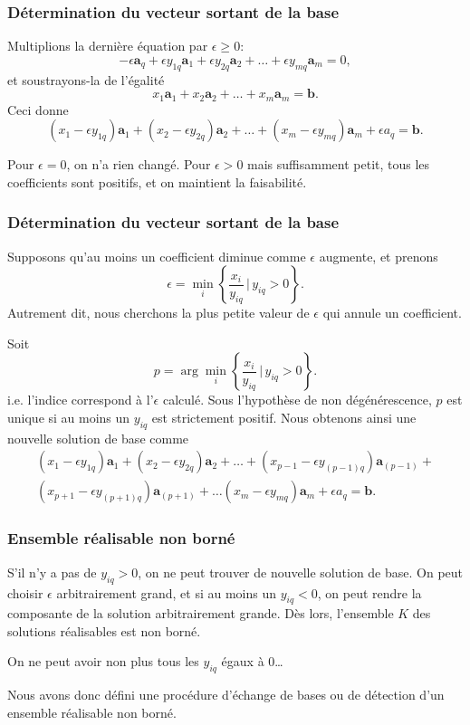 \documentclass[t,usepdftitle=false]{beamer}
\def\ba{\boldsymbol{a}}
\def\bb{\boldsymbol{b}}
\begin{document}
\begin{frame}
\frametitle{Détermination du vecteur sortant de la base}

Multiplions la dernière équation par $\epsilon \geq 0$:
\[
-\epsilon\ba_q + \epsilon y_{1q} \ba_1 + \epsilon y_{2q}\ba_2 + \ldots + \epsilon y_{mq} \ba_m = 0,
\]
et soustrayons-la de l'égalité
\[
x_1 \ba_1 + x_2 \ba_2 + \ldots + x_m \ba_m = \bb.
\]
Ceci donne
\[
(x_1 - \epsilon y_{1q}) \ba_1 + (x_2 - \epsilon y_{2q}) \ba_2 + \ldots + (x_m - \epsilon y_{mq}) \ba_m + \epsilon a_q = \bb.
\]

\mbox{}

Pour $\epsilon = 0$, on n'a rien changé. Pour $\epsilon > 0$ mais suffisamment petit, tous les coefficients sont positifs, et on maintient la faisabilité.

\end{frame}

\begin{frame}
\frametitle{Détermination du vecteur sortant de la base}

Supposons qu'au moins un coefficient diminue comme $\epsilon$ augmente, et prenons
\[
\epsilon = \min_i \left\lbrace \frac{x_i}{y_{iq}} \,\bigg|\, y_{iq} > 0 \right\rbrace.
\]
Autrement dit, nous cherchons la plus petite valeur de $\epsilon$ qui annule un coefficient.

\mbox{}

Soit
\[
p = \arg\min_i \left\lbrace \frac{x_i}{y_{iq}} \,\bigg|\, y_{iq} > 0 \right\rbrace.
\]
i.e. l'indice correspond à l'$\epsilon$ calculé.  Sous l'hypothèse de non dégénérescence, $p$ est unique si au moins un $y_{iq}$ est strictement positif.
Nous obtenons ainsi une nouvelle solution de base comme
\begin{multline*}
(x_1 - \epsilon y_{1q}) \ba_1 + (x_2 - \epsilon y_{2q}) \ba_2 + \ldots + (x_{p-1} - \epsilon y_{(p-1)q}) \ba_{(p-1)} + \\
(x_{p+1} - \epsilon y_{(p+1)q}) \ba_{(p+1)} + \ldots (x_m - \epsilon y_{mq}) \ba_m + \epsilon a_q = \bb.
\end{multline*}

\end{frame}

\begin{frame}
\frametitle{Ensemble réalisable non borné}

S'il n'y a pas de $y_{iq} > 0$, on ne peut trouver de nouvelle solution de base. On peut choisir $\epsilon$ arbitrairement grand, et si au moins un $y_{iq} < 0$, on peut rendre la composante de la solution arbitrairement grande. Dès lors, l'ensemble $K$ des solutions réalisables est non borné.

\mbox{}

On ne peut avoir non plus tous les $y_{iq}$ égaux à 0\ldots

\mbox{}

Nous avons donc défini une procédure d'échange de bases ou de détection d'un ensemble réalisable non borné.

\end{frame}
\end{document}

